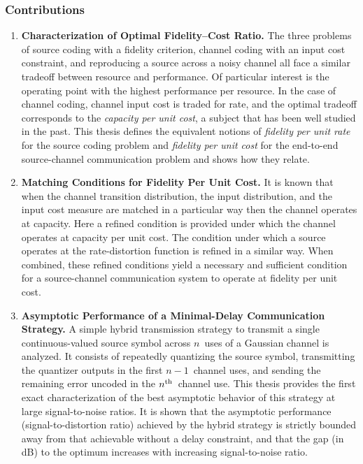 \subsubsection{Contributions}

\begin{enumerate}

  \item \textbf{Characterization of Optimal Fidelity--Cost Ratio.} The three
    problems of source coding with a fidelity criterion, channel coding with an
    input cost constraint, and reproducing a source across a noisy channel all
    face a similar tradeoff between resource and performance. Of particular
    interest is the operating point with the highest performance per resource.
    In the case of channel coding, channel input cost is traded for rate, and
    the optimal tradeoff corresponds to the \emph{capacity per unit cost}, a
    subject that has been well studied in the past. This thesis defines the
    equivalent notions of \emph{fidelity per unit rate} for the source coding
    problem and \emph{fidelity per unit cost} for the end-to-end source-channel
    communication problem and shows how they relate. 

  \item \textbf{Matching Conditions for Fidelity Per Unit Cost.} It is known
    that when the channel transition distribution, the input distribution, and
    the input cost measure are matched in a particular way then the channel
    operates at capacity. Here a refined condition is provided under which the
    channel operates at capacity per unit cost. The condition under which a
    source operates at the rate-distortion function is refined in a similar way.
    When combined, these refined conditions yield a necessary and sufficient
    condition for a source-channel communication system to operate at fidelity
    per unit cost. 

  \item \textbf{Asymptotic Performance of a Minimal-Delay Communication
    Strategy.} A simple hybrid transmission strategy to transmit a single
    continuous-valued source symbol across $n$~uses of a Gaussian channel is
    analyzed. It consists of repeatedly quantizing the source symbol,
    transmitting the quantizer outputs in the first $n-1$~channel uses, and
    sending the remaining error uncoded in the $n{^{\text{th}}}$~channel use. This thesis
    provides the first exact characterization of the best asymptotic behavior of
    this strategy at large signal-to-noise ratios. It is shown that the
    asymptotic performance (signal-to-distortion ratio) achieved by the hybrid
    strategy is strictly bounded away from that achievable without a delay
    constraint, and that the gap (in dB) to the optimum increases with
    increasing signal-to-noise ratio.


\end{enumerate}
